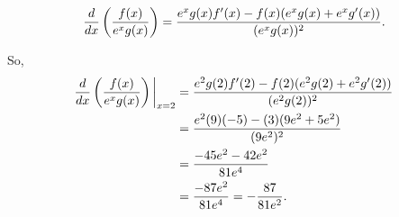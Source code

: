 \documentclass[nooutcomes]{ximera}
\begin{document}
\begin{problem}
\begin{enumerate}
	 
		\begin{freeResponse}
		$$\frac{d}{dx} \left( \frac{f(x)}{e^x g(x)} \right)
		= \frac{e^x g(x) f'(x) - f(x)(e^x g(x) + e^x g'(x))}{(e^x g(x))^2}.$$
		
		So, 
		\begin{align*}
		\frac{d}{dx}\left(\frac{f(x)}{e^x g(x)}\right) \bigg|_{x=2}
		&= \frac{e^2 g(2) f'(2) - f(2)(e^2 g(2) + e^2 g'(2))}{(e^2 g(2))^2}  \\
		&= \frac{e^2 (9)(-5) - (3)(9e^2 + 5e^2)}{(9e^2)^2}  \\
		&= \frac{-45e^2 -42e^2}{81e^4}  \\
		&= \frac{-87e^2}{81e^4} = - \frac{87}{81e^2}.
		\end{align*}
		\end{freeResponse}
		
		
		
	\end{enumerate}
		
\end{problem}







	
	
	
	
	
	
	
	
	

	










								
				
				
	
\end{document}
